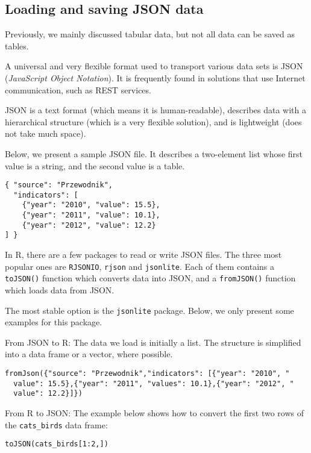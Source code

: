 \documentclass[]{book}
\theoremstyle{definition}
\theoremstyle{definition}
\theoremstyle{definition}
\theoremstyle{remark}
\begin{document}
\subsection{Loading and saving JSON data}\label{part_264}

Previously, we mainly discussed tabular data, but not all data can be
saved as tables.

A universal and very flexible format used to transport various data sets
is JSON (\emph{JavaScript Object Notation}). It is frequently found in
solutions that use Internet communication, such as REST services.

JSON is a text format (which means it is human-readable), describes data
with a hierarchical structure (which is a very flexible solution), and
is lightweight (does not take much space).

Below, we present a sample JSON file. It describes a two-element list
whose first value is a string, and the second value is a table.

\begin{verbatim}
{ "source": "Przewodnik",
  "indicators": [
    {"year": "2010", "value": 15.5},
    {"year": "2011", "value": 10.1},
    {"year": "2012", "value": 12.2}
] }
\end{verbatim}

In R, there are a few packages to read or write JSON files. The three
most popular ones are \texttt{RJSONIO}, \texttt{rjson} and
\texttt{jsonlite}. Each of them contains a \texttt{toJSON()} function
which converts data into JSON, and a \texttt{fromJSON()} function which
loads data from JSON.

The most stable option is the \texttt{jsonlite} package. Below, we only
present some examples for this package.

From JSON to R: The data we load is initially a list. The structure is
simplified into a data frame or a vector, where possible.

\begin{verbatim}
fromJson({"source": "Przewodnik","indicators": [{"year": "2010", "
  value": 15.5},{"year": "2011", "values": 10.1},{"year": "2012", "
  value": 12.2}]})
\end{verbatim}

From R to JSON: The example below shows how to convert the first two
rows of the \texttt{cats\_birds} data frame:

\begin{verbatim}
toJSON(cats_birds[1:2,])
\end{verbatim}

\renewcommand\bibname{References}

\end{document}
